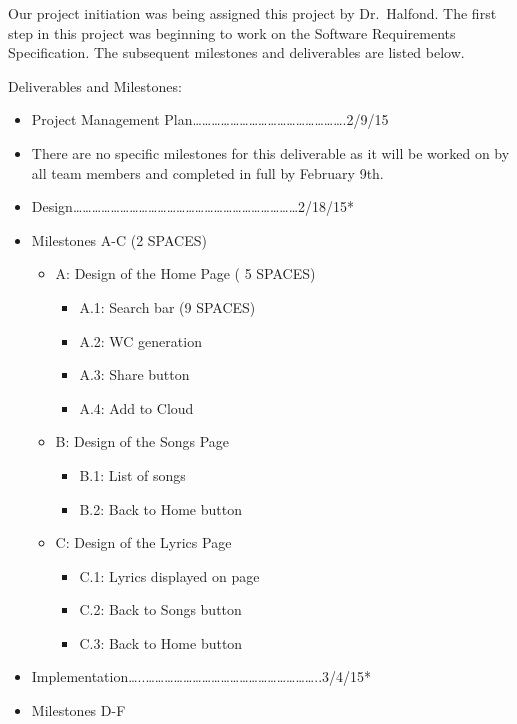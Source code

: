 \documentclass[]{article}
\begin{document}
Our project initiation was being assigned this project by Dr.~Halfond.
The first step in this project was beginning to work on the Software
Requirements Specification. The subsequent milestones and deliverables
are listed below.

Deliverables and Milestones:

\begin{itemize}
\itemsep1pt\parskip0pt
\item
  Project Management
  Plan\ldots{}\ldots{}\ldots{}\ldots{}\ldots{}\ldots{}\ldots{}\ldots{}\ldots{}\ldots{}\ldots{}\ldots{}\ldots{}\ldots{}\ldots{}\ldots{}.2/9/15
\item
  There are no specific milestones for this deliverable as it will be
  worked on by all team members and completed in full by February 9th.
\item
  Design\ldots{}\ldots{}\ldots{}\ldots{}\ldots{}\ldots{}\ldots{}\ldots{}\ldots{}\ldots{}\ldots{}\ldots{}\ldots{}\ldots{}\ldots{}\ldots{}\ldots{}\ldots{}\ldots{}\ldots{}\ldots{}\ldots{}\ldots{}\ldots{}2/18/15*
\item
  Milestones A-C (2 SPACES)

  \begin{itemize}
  \itemsep1pt\parskip0pt
  \item
    A: Design of the Home Page ( 5 SPACES)

    \begin{itemize}
    \itemsep1pt\parskip0pt
    \item
      A.1: Search bar (9 SPACES)
    \item
      A.2: WC generation
    \item
      A.3: Share button
    \item
      A.4: Add to Cloud
    \end{itemize}
  \item
    B: Design of the Songs Page

    \begin{itemize}
    \itemsep1pt\parskip0pt
    \item
      B.1: List of songs
    \item
      B.2: Back to Home button
    \end{itemize}
  \item
    C: Design of the Lyrics Page

    \begin{itemize}
    \itemsep1pt\parskip0pt
    \item
      C.1: Lyrics displayed on page
    \item
      C.2: Back to Songs button
    \item
      C.3: Back to Home button
    \end{itemize}
  \end{itemize}
\item
  Implementation\ldots{}..\ldots{}\ldots{}\ldots{}\ldots{}\ldots{}\ldots{}\ldots{}\ldots{}\ldots{}\ldots{}\ldots{}\ldots{}\ldots{}\ldots{}\ldots{}\ldots{}\ldots{}\ldots{}..3/4/15*
\item
  Milestones D-F


\end{itemize}
\end{document}
